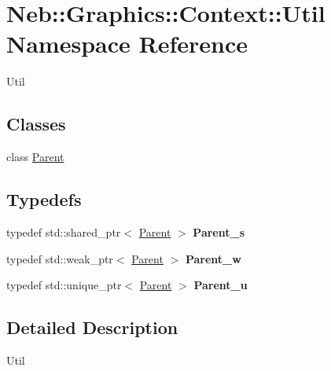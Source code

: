 \hypertarget{namespaceNeb_1_1Graphics_1_1Context_1_1Util}{\section{Neb\-:\-:Graphics\-:\-:Context\-:\-:Util Namespace Reference}
\label{namespaceNeb_1_1Graphics_1_1Context_1_1Util}
}


Util  


\subsection*{Classes}
\begin{DoxyCompactItemize}
\item 
class \hyperlink{classNeb_1_1Graphics_1_1Context_1_1Util_1_1Parent}{Parent}
\end{DoxyCompactItemize}
\subsection*{Typedefs}
\begin{DoxyCompactItemize}
\item 
\hypertarget{namespaceNeb_1_1Graphics_1_1Context_1_1Util_a6df4a46222ac4fb06e0630a89448fd5b}{typedef std\-::shared\-\_\-ptr$<$ \hyperlink{classNeb_1_1Graphics_1_1Context_1_1Util_1_1Parent}{Parent} $>$ {\bfseries Parent\-\_\-s}}\label{namespaceNeb_1_1Graphics_1_1Context_1_1Util_a6df4a46222ac4fb06e0630a89448fd5b}

\item 
\hypertarget{namespaceNeb_1_1Graphics_1_1Context_1_1Util_a75157c4132e7e14b960043e8d2d0cef8}{typedef std\-::weak\-\_\-ptr$<$ \hyperlink{classNeb_1_1Graphics_1_1Context_1_1Util_1_1Parent}{Parent} $>$ {\bfseries Parent\-\_\-w}}\label{namespaceNeb_1_1Graphics_1_1Context_1_1Util_a75157c4132e7e14b960043e8d2d0cef8}

\item 
\hypertarget{namespaceNeb_1_1Graphics_1_1Context_1_1Util_abffe8833279569d4bf50ca054ff849cd}{typedef std\-::unique\-\_\-ptr$<$ \hyperlink{classNeb_1_1Graphics_1_1Context_1_1Util_1_1Parent}{Parent} $>$ {\bfseries Parent\-\_\-u}}\label{namespaceNeb_1_1Graphics_1_1Context_1_1Util_abffe8833279569d4bf50ca054ff849cd}

\end{DoxyCompactItemize}


\subsection{Detailed Description}
Util 